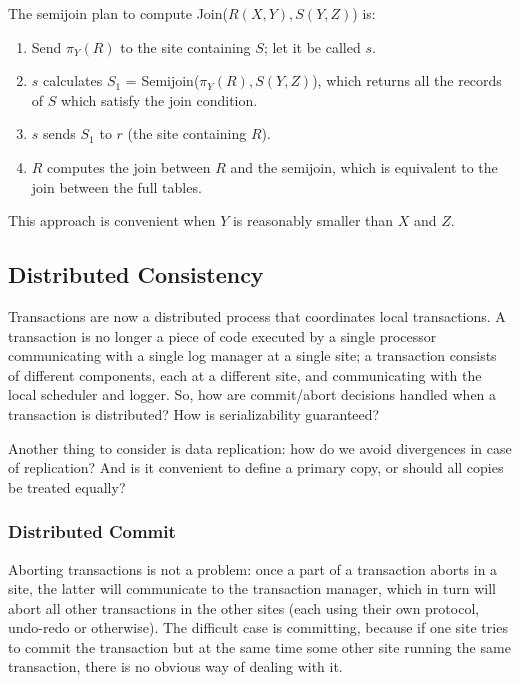 The semijoin plan to compute Join($R(X,Y), S(Y,Z)$) is:
\begin{enumerate}
    \item Send $\pi_Y(R)$ to the site containing $S$; let it be called $s$.

    \item $s$ calculates $S_1$ = Semijoin($\pi_Y(R), S(Y,Z)$), which returns all the records of $S$ which satisfy the join condition.

    \item $s$ sends $S_1$ to $r$ (the site containing $R$).

    \item $R$ computes the join between $R$ and the semijoin, which is equivalent to the join between the full tables.
\end{enumerate}
This approach is convenient when $Y$ is reasonably smaller than $X$ and $Z$.

\subsection{Distributed Consistency}

Transactions are now a distributed process that coordinates local transactions. A transaction is no longer a piece of code executed by a single processor communicating with a single log manager at a single site; a transaction consists of different components, each at a different site, and communicating with the local scheduler and logger. So, how are commit/abort decisions handled when a transaction is distributed? How is serializability guaranteed?

Another thing to consider is data replication: how do we avoid divergences in case of replication? And is it convenient to define a primary copy, or should all copies be treated equally?

\subsubsection{Distributed Commit}

Aborting transactions is not a problem: once a part of a transaction aborts in a site, the latter will communicate to the transaction manager, which in turn will abort all other transactions in the other sites (each using their own protocol, undo-redo or otherwise). The difficult case is committing, because if one site tries to commit the transaction but at the same time some other site running the same transaction, there is no obvious way of dealing with it.

